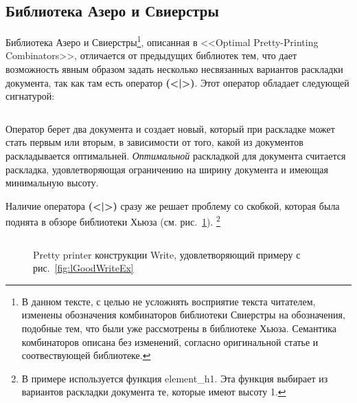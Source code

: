\newpage

\subsection{Библиотека Азеро и Свиерстры}

Библиотека Азеро и Свиерстры\footnote{
В данном тексте, с целью не усложнять восприятие текста читателем, изменены обозначения комбинаторов библиотеки Свиерстры на обозначения, подобные тем, что были уже рассмотрены в библиотеке Хьюза. Семантика комбинаторов описана без изменений, согласно оригинальной статье и соотвествующей библиотеке.
}, описанная в <<Optimal Pretty-Printing Combinators>>\cite{swierstra}, отличается от предыдущих библиотек тем, что дает возможность явным образом задать несколько несвязанных вариантов раскладки документа, так как там есть оператор \textbf{(<|>)}. Этот оператор обладает следующей сигнатурой:
\inputminted{haskell}{codes/chooseSw.hs}
Оператор берет два документа и создает новый, который при раскладке может стать первым или вторым, в зависимости от того, какой из документов раскладывается оптимальней. \textit{Оптимальной} раскладкой для документа считается раскладка, удовлетворяющая ограничению на ширину документа и имеющая минимальную высоту.

Наличие оператора \textbf{(<|>)} сразу же решает проблему со скобкой, которая была поднята в обзоре библиотеки Хьюза (см. рис.~\ref{fig:bracketSwierstra}).
\footnote{
	В примере используется функция element\_h1. Эта функция выбирает из вариантов раскладки документа те, которые имеют высоту 1.
}

\begin{figure}[h!]
	\inputminted{haskell}{codes/bracketSwierstra.hs}
	\caption{Pretty printer конструкции Write, удовлетворяющий примеру с рис.~\ref{fig:lGoodWriteEx}}
	\label{fig:bracketSwierstra}
\end{figure}

